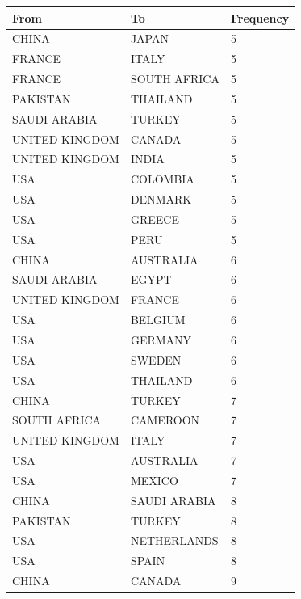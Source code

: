 \begin{table}[htp]
    \centering
\begin{tabular}{|l|l|l|}
\hline
From           & To             & Frequency \\ \hline
CHINA          & JAPAN          & 5         \\
FRANCE         & ITALY          & 5         \\
FRANCE         & SOUTH AFRICA   & 5         \\
PAKISTAN       & THAILAND       & 5         \\
SAUDI ARABIA   & TURKEY         & 5         \\
UNITED KINGDOM & CANADA         & 5         \\
UNITED KINGDOM & INDIA          & 5         \\
USA            & COLOMBIA       & 5         \\
USA            & DENMARK        & 5         \\
USA            & GREECE         & 5         \\
USA            & PERU           & 5         \\
CHINA          & AUSTRALIA      & 6         \\
SAUDI ARABIA   & EGYPT          & 6         \\
UNITED KINGDOM & FRANCE         & 6         \\
USA            & BELGIUM        & 6         \\
USA            & GERMANY        & 6         \\
USA            & SWEDEN         & 6         \\
USA            & THAILAND       & 6         \\
CHINA          & TURKEY         & 7         \\
SOUTH AFRICA   & CAMEROON       & 7         \\
UNITED KINGDOM & ITALY          & 7         \\
USA            & AUSTRALIA      & 7         \\
USA            & MEXICO         & 7         \\
CHINA          & SAUDI ARABIA   & 8         \\
PAKISTAN       & TURKEY         & 8         \\
USA            & NETHERLANDS    & 8         \\
USA            & SPAIN          & 8         \\
CHINA          & CANADA         & 9         \\

\end{tabular}
\end{table}
